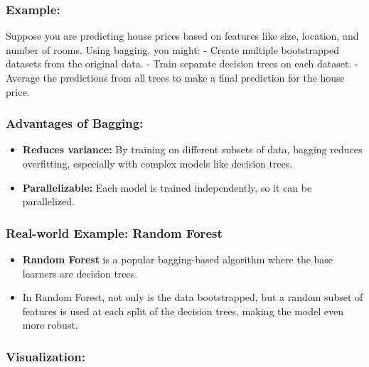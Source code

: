\documentclass[12pt]{book}
\providecommand{\tightlist}{%
  \setlength{\itemsep}{0pt}\setlength{\parskip}{0pt}}
\begin{document}
\subsubsection{\texorpdfstring{\textbf{Example:}}{Example:}}\label{example}

Suppose you are predicting house prices based on features like size,
location, and number of rooms. Using bagging, you might: - Create
multiple bootstrapped datasets from the original data. - Train separate
decision trees on each dataset. - Average the predictions from all trees
to make a final prediction for the house price.

\subsubsection{\texorpdfstring{\textbf{Advantages of
Bagging:}}{Advantages of Bagging:}}\label{advantages-of-bagging}

\begin{itemize}
\tightlist
\item
  \textbf{Reduces variance:} By training on different subsets of data,
  bagging reduces overfitting, especially with complex models like
  decision trees.
\item
  \textbf{Parallelizable:} Each model is trained independently, so it
  can be parallelized.
\end{itemize}

\subsubsection{\texorpdfstring{\textbf{Real-world Example: Random
Forest}}{Real-world Example: Random Forest}}\label{real-world-example-random-forest}

\begin{itemize}
\tightlist
\item
  \textbf{Random Forest} is a popular bagging-based algorithm where the
  base learners are decision trees.
\item
  In Random Forest, not only is the data bootstrapped, but a random
  subset of features is used at each split of the decision trees, making
  the model even more robust.
\end{itemize}

\subsubsection{\texorpdfstring{\textbf{Visualization:}}{Visualization:}}\label{visualization}
\end{document}
